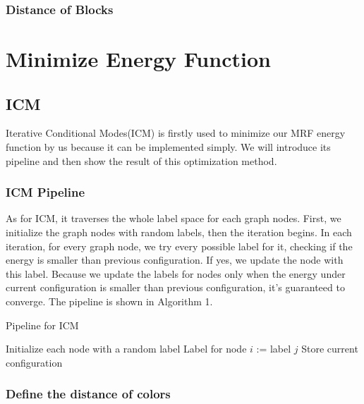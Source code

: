 \documentclass{article} %
\begin{document}
		\subsubsection{Distance of Blocks}
\section{Minimize Energy Function}
	\subsection{ICM}
	Iterative Conditional Modes(ICM)\cite{besag1986} is firstly used to minimize our MRF energy function by us because it can be implemented simply. We will introduce its pipeline and then show the result of this optimization method.
		\subsubsection{ICM Pipeline}

			As for ICM, it traverses the whole label space for each graph nodes. First, we initialize the graph nodes with random labels, then the iteration begins. In each iteration, for every graph node, we try every possible label for it, checking if the energy is smaller than previous configuration. If yes, we update the node with this label. Because we update the labels for nodes only when the energy under current configuration is smaller than previous configuration, it's guaranteed to converge. The pipeline is shown in Algorithm 1.
			\begin{algorithm}
			\caption{Pipeline for ICM}
			\begin{algorithmic}
			\State Initialize each node with a random label
							\State Label for node $i$ := label $j$
						\EndIf
					\EndFor
				\EndFor
				\State Store current configuration
			\EndWhile
			\end{algorithmic}
			\end{algorithm}
        \subsubsection{Define the distance of colors}
\end{document}
